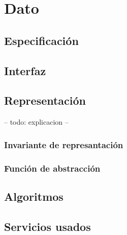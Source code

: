 \section{Dato}

\subsection{Especificación}

\subsection{Interfaz}

\iusa{}

\ioperaciones

\subsection{Representación}

-- todo: explicacion --


\subsubsection{Invariante de represantación}

\subsubsection{Función de abstracción}

\subsection{Algoritmos}

\subsection{Servicios usados}

